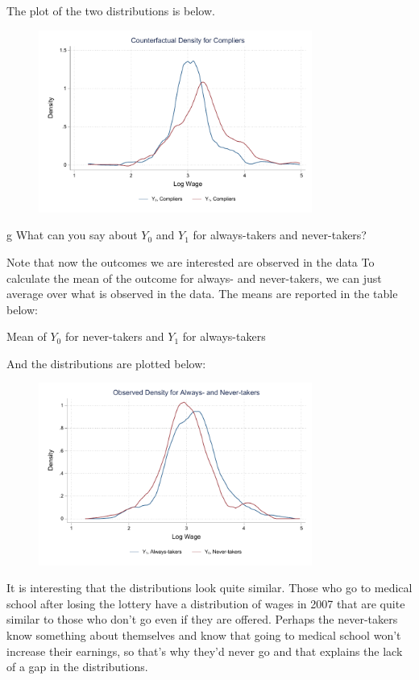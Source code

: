\documentclass{article}
\begin{document}
\begin{solution}
The plot of the two distributions is below.
\begin{figure}[H]
    \centering
    \includegraphics[width=0.8\textwidth]{ps3/figures/q4_partF_compliers.pdf}
\end{figure}
\end{solution}

\begin{problem}{g}
What can you say about $Y_{0}$ and $Y_{1}$ for always-takers and never-takers?
\end{problem}
\begin{solution}
Note that now the outcomes we are interested are observed in the data To calculate the mean of the outcome for always- and never-takers, we can just average over what is observed in the data. The means are reported in the table below:
\begin{table}[H]
    \centering
    
    \caption{Mean of $Y_0$ for never-takers and $Y_1$ for always-takers}
\end{table}
And the distributions are plotted below:
\begin{figure}[H]
    \centering
    \includegraphics[width=0.8\textwidth]{ps3/figures/q4_partG_observed.pdf}
\end{figure}
\vspace{-1cm}
It is interesting that the distributions look quite similar. Those who go to medical school after losing the lottery have a distribution of wages in 2007 that are quite similar to those who don't go even if they are offered. Perhaps the never-takers know something about themselves and know that going to medical school won't increase their earnings, so that's why they'd never go and that explains the lack of a gap in the distributions.
\end{solution}
\end{document}
